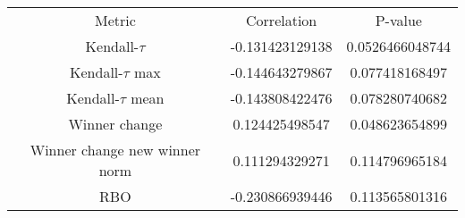\begin{tabular}{c|c|c}
Metric & Correlation & P-value \\ 
Kendall-$\tau$ & -0.131423129138 & 0.0526466048744 \\ 
Kendall-$\tau$ max & -0.144643279867 & 0.077418168497 \\ 
Kendall-$\tau$ mean & -0.143808422476 & 0.078280740682 \\ 
Winner change & 0.124425498547 & 0.048623654899 \\ 
Winner change new winner norm & 0.111294329271 & 0.114796965184 \\ 
RBO & -0.230866939446 & 0.113565801316 \\ 
\end{tabular}